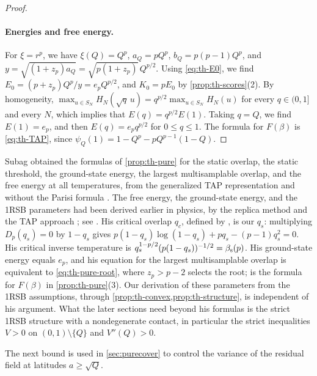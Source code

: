 \begin{proof}
\paragraph{Energies and free energy.}
For $\xi=r^p$, we have $\xi(Q)=Q^p$, $a_Q=pQ^p$, $b_Q=p(p-1)Q^p$, and $y=\sqrt{(1+z_p)a_Q}=\sqrt{p(1+z_p)}\,Q^{p/2}$. Using \eqref{eq:th-E0}, we find $E_0=(p+z_p)Q^p/y=e_pQ^{p/2}$, and $K_0=pE_0$ by \cref{prop:th-scores}(2). By homogeneity, $\max_{u\in S_N}H_N(\sqrt q\,u)=q^{p/2}\max_{u\in S_N}H_N(u)$ for every $q\in(0,1]$ and every $N$, which implies that $E(q)=q^{p/2}E(1)$. Taking $q=Q$, we find $E(1)=e_p$, and then $E(q)=e_pq^{p/2}$ for $0\le q\le1$. The formula for $F(\beta)$ is \eqref{eq:th-TAP}, since $\psi_Q(1)=1-Q^p-pQ^{p-1}(1-Q)$.
\end{proof}

\begin{remark}\label{rem:th-pure-subag}
Subag obtained the formulas of \cref{prop:th-pure} for the static overlap, the static threshold, the ground-state energy, the largest multisamplable overlap, and the free energy at all temperatures, from the generalized TAP representation and without the Parisi formula \cite[Theorems~1 and~2, (1.9)--(1.13)]{Subag2023pure}. The free energy, the ground-state energy, and the 1RSB parameters had been derived earlier in physics, by the replica method and the TAP approach \cite{CrisantiSommers1992,KurchanParisiVirasoro1993,CrisantiSommers1995TAP}; see \cite[Section~1.1]{Subag2023pure}. His critical overlap $q_c$, defined by \cite[(1.9)]{Subag2023pure}, is our $q_s$: multiplying $D_p(q_s)=0$ by $1-q_s$ gives $p(1-q_s)\log(1-q_s)+pq_s-(p-1)q_s^2=0$. His critical inverse temperature \cite[(1.10)]{Subag2023pure} is $q_s^{1-p/2}(p(1-q_s))^{-1/2}=\beta_{\mathrm s}(p)$. His ground-state energy \cite[(1.11)]{Subag2023pure} equals $e_p$, and his equation \cite[(1.12)]{Subag2023pure} for the largest multisamplable overlap is equivalent to \eqref{eq:th-pure-root}, where $z_p>p-2$ selects the root; \cite[(1.13)]{Subag2023pure} is the formula for $F(\beta)$ in \cref{prop:th-pure}(3). Our derivation of these parameters from the 1RSB assumptions, through \cref{prop:th-convex,prop:th-structure}, is independent of his argument. What the later sections need beyond his formulas is the strict 1RSB structure with a nondegenerate contact, in particular the strict inequalities $V>0$ on $(0,1)\setminus\{Q\}$ and $V''(Q)>0$.
\end{remark}

The next bound is used in \cref{sec:purecover} to control the variance of the residual field at latitudes $a\ge\sqrt Q$.

